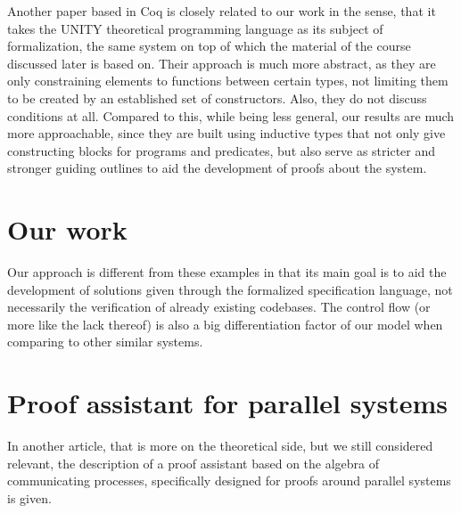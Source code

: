 Another paper based in Coq \cite{Heyd1996AMC} is closely related to our work in the sense, that it takes the UNITY theoretical programming language as its subject of formalization, the same system on top of which the material of the course discussed later is based on. Their approach is much more abstract, as they are only constraining elements to functions between certain types, not limiting them to be created by an established set of constructors. Also, they do not discuss conditions at all. Compared to this, while being less general, our results are much more approachable, since they are built using inductive types that not only give constructing blocks for programs and predicates, but also serve as stricter and stronger guiding outlines to aid the development of proofs about the system.

\section{Our work}
Our approach is different from these examples in that its main goal is to aid the development of solutions given through the formalized specification language, not necessarily the verification of already existing codebases. The control flow (or more like the lack thereof) is also a big differentiation factor of our model when comparing to other similar systems.

\section{Proof assistant for parallel systems}
In another article\cite{Mauw1991APA}, that is more on the theoretical side, but we still considered relevant, the description of a proof assistant based on the algebra of communicating processes, specifically designed for proofs around parallel systems is given.




